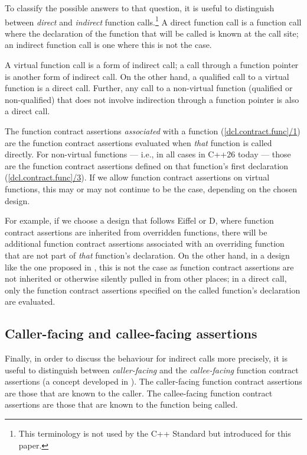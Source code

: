 To classify the possible answers to that question, it is useful to distinguish between \emph{direct} and \emph{indirect} function calls.\footnote{This terminology is not used by the C++ Standard but introduced for this paper.} A direct function call is a function call where the declaration of the function that will be called is known at the call site; an indirect function call is one where this is not the case.

A virtual function call is a form of indirect call; a call through a function pointer is another form of indirect call. On the other hand, a qualified call to a virtual function is a direct call. Further, any call to a non-virtual function (qualified or non-qualified) that does not involve indirection through a function pointer is also a direct call. 

The function contract assertions \emph{associated} with a function (\href{https://eel.is/c++draft/dcl.contract.func#1}{[dcl.contract.func]/1}) are the function contract assertions evaluated when \emph{that} function is called directly. For non-virtual functions  --- i.e., in all cases in C++26 today --- those are the function contract assertions defined on that function's first declaration (\href{https://eel.is/c++draft/dcl.contract.func#3.sentence-1}{[dcl.contract.func]/3}). If we allow function contract assertions on virtual functions, this may or may not continue to be the case, depending on the chosen design.

For example, if we choose a design that follows Eiffel or D, where function contract assertions are inherited from overridden functions, there will be additional function contract assertions associated with an overriding function that are not part of \emph{that} function's declaration. On the other hand, in a design like the one proposed in \cite{P3097R0}, this is not the case as function contract assertions are not inherited or otherwise silently pulled in from other places; in a direct call, only the function contract assertions specified on the called function's declaration are evaluated.

\subsection{Caller-facing and callee-facing assertions}

Finally, in order to discuss the behaviour for indirect calls more precisely, it is useful to distinguish between \emph{caller-facing} and the \emph{callee-facing} function contract assertions (a concept developed in \cite{P3097R0}). The caller-facing function contract assertions are those that are known to the caller. The callee-facing function contract assertions are those that are known to the function being called.

